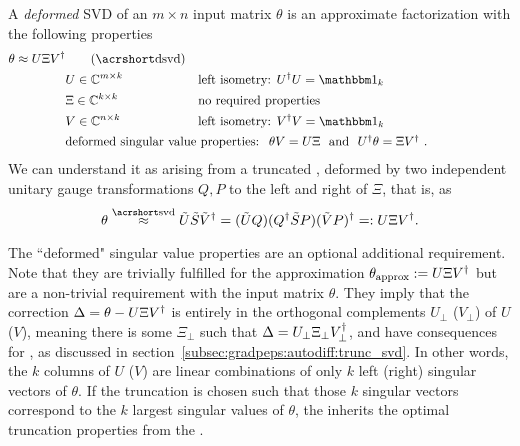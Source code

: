 A \emph{deformed} SVD of an $m \times n$ input matrix $\theta$ is an approximate factorization with the following properties
%
\begin{equation}
\label{eq:truncation:factorizations:dsvd}
\begin{aligned}
    \theta \approx U \Xi  \hconj{V} &\qquad \text{(\acroshort{dsvd})} &&
    \\
    &U \in \Cbb^{m \times k} &&\text{left isometry: } \hconj{U} U = \eye_k
    \\
    &\Xi  \in \Cbb^{k \times k} &&\text{no required properties}
    \\
    &V \in \Cbb^{n \times k} &&\text{left isometry: } \hconj{V} V = \eye_k
    \qquad\qquad\qquad\qquad\qquad
    \\
    & \omit\rlap{\text{deformed singular value properties: } $\theta V = U \Xi$  \text{ and } $\hconj{U}\theta = \Xi  \hconj{V}$~.} 
\end{aligned}
\end{equation}
%
We can understand it as arising from a truncated , deformed by two independent unitary gauge transformations $Q, P$ to the left and right of $\Xi$, that is, as
\begin{equation}
    \theta
    \overset{\text{\acroshort{svd}}}{\approx} \tilde{U} \tilde{S} \hconj{\tilde{V}}
    = (\tilde{U} Q) (Q^\dagger \tilde{S}  P) (\tilde{V} P)^\dagger
    =: U \Xi V^\dagger
    .
\end{equation}

The ``deformed" singular value properties are an optional additional requirement.
%
Note that they are trivially fulfilled for the approximation $\theta_\text{approx} := U \Xi V^\dagger$ but are a non-trivial requirement with the input matrix $\theta$.
%
They imply that the correction $\Delta = \theta - U \Xi V^\dagger$ is entirely in the orthogonal complements $U_\perp$ ($V_\perp$) of $U$ ($V$), meaning there is some $\Xi_\perp$ such that $\Delta = U_\perp \Xi_\perp V_\perp^\dagger$, and have consequences for , as discussed in section~\ref{subsec:gradpeps:autodiff:trunc_svd}.
%
In other words, the $k$ columns of $U$ ($V$) are linear combinations of only $k$ left (right) singular vectors of $\theta$.
%
If the truncation is chosen such that those $k$ singular vectors correspond to the $k$ largest singular values of $\theta$, the  inherits the optimal truncation properties from the .



